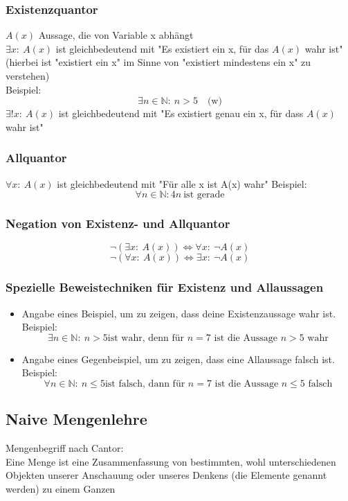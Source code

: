 \documentclass[a4paper]{scrartcl}
\DeclareMathOperator{\Forall}{\forall}
\theoremstyle{definition}
\theoremstyle{plain}
\theoremstyle{plain}
\theoremstyle{remark}
\theoremstyle{remark}
\theoremstyle{remark}
\theoremstyle{remark}
\theoremstyle{remark}
\begin{document}
\subsubsection{Existenzquantor}
\label{sec-2-3-1}
$A(x)$ Aussage, die von Variable x abhängt \\
    $\exists x:~A(x)$ ist gleichbedeutend mit "Es existiert ein x, für das $A(x)$ wahr ist" (hierbei ist "existiert ein x" im Sinne von "existiert mindestens ein x" zu verstehen) \\
    Beispiel:
\[\exists n\in\mathbb{N}:~n>5\quad\text{(w)}\]
$\exists !x:~A(x)$ ist gleichbedeutend mit "Es existiert genau ein x, für dass $A(x)$ wahr ist"
\subsubsection{Allquantor}
\label{sec-2-3-2}
$\Forall x:~A(x)$ ist gleichbedeutend mit "Für alle x ist A(x) wahr"
Beispiel:
\[\Forall n\in\mathbb{N}: 4n~\text{ist gerade}\]
\subsubsection{Negation von Existenz- und Allquantor}
\label{sec-2-3-3}
\[\neg(\exists x:~A(x)) \iff \Forall x:~\neg A(x)\]
\[\neg(\Forall x:~A(x)) \iff \exists x:~\neg A(x)\]
\subsubsection{Spezielle Beweistechniken für Existenz und Allaussagen}
\label{sec-2-3-4}
\begin{itemize}
\item Angabe eines Beispiel, um zu zeigen, dass deine Existenzaussage wahr ist. \\
      Beispiel:
\[\exists n\in\mathbb{N}:~n>5 \text{ist wahr, denn für $n = 7$ ist die Aussage $n > 5$ wahr}\]
\item Angabe eines Gegenbeispiel, um zu zeigen, dass eine Allaussage falsch ist. \\
      Beispiel:
\[\Forall n\in\mathbb{N}:~n\leq 5 \text{ist falsch, dann für $n=7$ ist die Aussage $n\leq 5$ falsch}\]
\end{itemize}
\subsection{Naive Mengenlehre}
\label{sec-2-4}
Mengenbegriff nach Cantor: \\
   Eine Menge ist eine Zusammenfassung von bestimmten, wohl unterschiedenen Objekten unserer Anschauung oder unseres Denkens (die Elemente genannt werden) zu einem Ganzen
\end{document}
